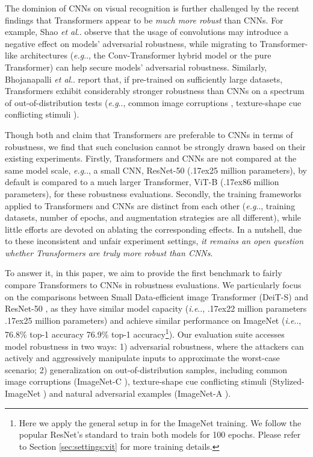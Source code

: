 \documentclass{article}
\makeatletter
\def\vs{{\bm{s}}}
\newcommand{\app}{\raise.17ex\hbox{}}
\DeclareRobustCommand\onedot{\futurelet\@let@token\@onedot}
\def\@onedot{\ifx\@let@token.\else.\null\fi\xspace}
\def\eg{\emph{e.g}\onedot} \def\Eg{\emph{E.g}\onedot}
\def\ie{\emph{i.e}\onedot} \def\Ie{\emph{I.e}\onedot}
\def\etal{\emph{et al}\onedot}
\makeatother
\begin{document}
The dominion of CNNs on visual recognition is further challenged by the recent findings that Transformers appear to be \emph{much more robust} than CNNs. For example, Shao \etal \cite{shao2021adversarial} observe that the usage of convolutions may introduce a negative effect on models' adversarial robustness, while migrating to Transformer-like architectures (\eg, the Conv-Transformer hybrid model or the pure Transformer) can help secure models' adversarial robustness. Similarly, Bhojanapalli \etal \cite{bhojanapalli2021understanding} report that, if pre-trained on sufficiently large datasets, Transformers exhibit considerably stronger robustness than CNNs on a spectrum of out-of-distribution tests (\eg, common image corruptions \cite{Hendrycks2018}, texture-shape cue conflicting stimuli \cite{Geirhos2018}).  

Though both \cite{bhojanapalli2021understanding} and \cite{shao2021adversarial} claim that Transformers are preferable to CNNs in terms of robustness, we find that such conclusion cannot be strongly drawn based on their existing experiments. Firstly, Transformers and CNNs are not compared at the same model scale, \eg, a small CNN, ResNet-50 (\app25 million parameters), by default is compared to a much larger Transformer, ViT-B (\app86 million parameters), for these robustness evaluations. Secondly, the training frameworks applied to Transformers and CNNs are distinct from each other (\eg, training datasets, number of epochs, and augmentation strategies are all different), while little efforts are devoted on ablating the corresponding effects. In a nutshell, due to these inconsistent and unfair experiment settings, \emph{it remains an open question whether Transformers are truly more robust than CNNs}.

To answer it, in this paper, we aim to provide the first benchmark to fairly compare Transformers to CNNs in robustness evaluations. We particularly focus on the comparisons between Small Data-efficient image Transformer (DeiT-S) \cite{touvron2020training} and ResNet-50 \cite{He2016}, as they have similar model capacity (\ie, \app22 million parameters \vs \app25 million parameters) and achieve similar performance on ImageNet (\ie, 76.8\% top-1 accuracy \vs 76.9\% top-1 accuracy\footnote{Here we apply the general setup in \cite{pmlr-v139-touvron21a} for the ImageNet training. We follow the popular ResNet's standard to train both models for 100 epochs. Please refer to Section \ref{sec:settings:vit} for more  training details.}). Our evaluation suite accesses model robustness in two ways: 1) adversarial robustness, where the attackers can actively and aggressively manipulate inputs to approximate the worst-case scenario; 2) generalization on out-of-distribution samples, including common image corruptions (ImageNet-C \cite{Hendrycks2018}), texture-shape cue conflicting stimuli (Stylized-ImageNet \cite{Geirhos2018}) and natural adversarial examples (ImageNet-A \cite{hendrycks2021nae}).
\end{document}
